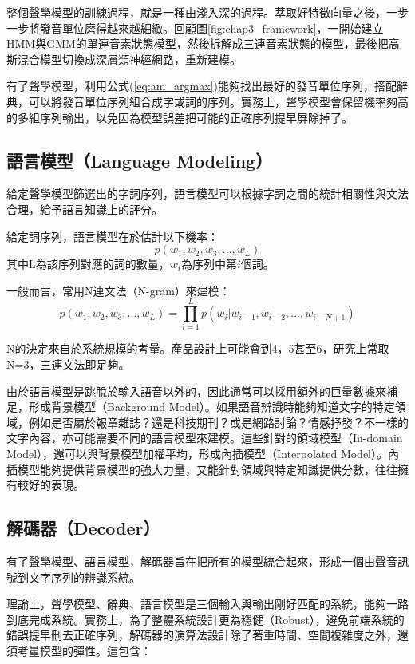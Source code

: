 整個聲學模型的訓練過程，就是一種由淺入深的過程。萃取好特徵向量之後，一步一步將發音單位磨得越來越細緻。回顧圖\ref{fig:chap3_framework}，一開始建立HMM與GMM的單連音素狀態模型，然後拆解成三連音素狀態的模型，最後把高斯混合模型切換成深層類神經網路，重新建模。

有了聲學模型，利用公式(\ref{eq:am_argmax})能夠找出最好的發音單位序列，搭配辭典，可以將發音單位序列組合成字或詞的序列。實務上，聲學模型會保留機率夠高的多組序列輸出，以免因為模型誤差把可能的正確序列提早屏除掉了。

\subsection{語言模型（Language Modeling）}

給定聲學模型篩選出的字詞序列，語言模型可以根據字詞之間的統計相關性與文法合理，給予語言知識上的評分。

給定詞序列，語言模型在於估計以下機率：
\begin{equation}
p( w_1 , w_2 , w_3 , ... , w_L )
\end{equation}
其中L為該序列對應的詞的數量，$w_i$為序列中第$i$個詞。

一般而言，常用N連文法（N-gram）來建模：
\begin{equation}
p( w_1 , w_2 , w_3 , ... , w_L ) = \prod_{i = 1}^L p( w_i | w_{i-1} , w_{i-2} , ... , w_{i-N+1} )
\end{equation}

N的決定來自於系統規模的考量。產品設計上可能會到4，5甚至6，研究上常取N=3，三連文法即足夠。

由於語言模型是跳脫於輸入語音以外的，因此通常可以採用額外的巨量數據來補足，形成背景模型（Background Model）。如果語音辨識時能夠知道文字的特定領域，例如是否屬於報章雜誌？還是科技期刊？或是網路討論？情感抒發？不一樣的文字內容，亦可能需要不同的語言模型來建模。這些針對的領域模型（In-domain Model），還可以與背景模型加權平均，形成內插模型（Interpolated Model）。內插模型能夠提供背景模型的強大力量，又能針對領域與特定知識提供分數，往往擁有較好的表現。

\subsection{解碼器（Decoder）}
有了聲學模型、語言模型，解碼器旨在把所有的模型統合起來，形成一個由聲音訊號到文字序列的辨識系統。

理論上，聲學模型、辭典、語言模型是三個輸入與輸出剛好匹配的系統，能夠一路到底完成系統。實務上，為了整體系統設計更為穩健（Robust），避免前端系統的錯誤提早刪去正確序列，解碼器的演算法設計除了著重時間、空間複雜度之外，還須考量模型的彈性。這包含：

